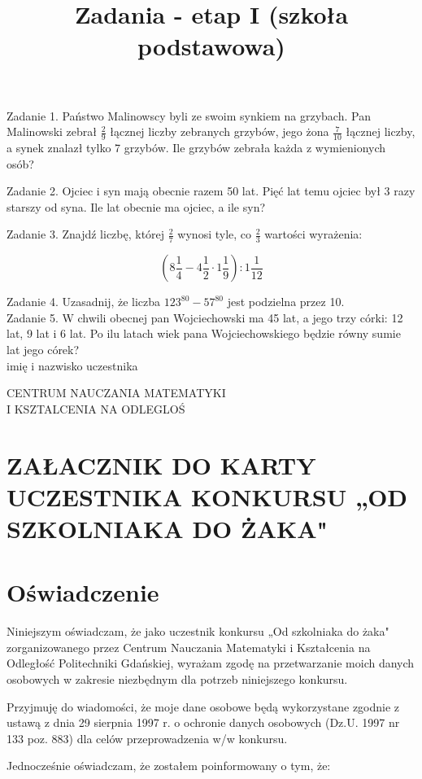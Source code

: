 \documentclass[10pt]{article}
\title{Zadania - etap I (szkoła podstawowa) }
\author{}
\date{}
\begin{document}
\maketitle
Zadanie 1. Państwo Malinowscy byli ze swoim synkiem na grzybach. Pan Malinowski zebrał \(\frac{2}{9}\) łącznej liczby zebranych grzybów, jego żona \(\frac{7}{10}\) łącznej liczby, a synek znalazł tylko 7 grzybów. Ile grzybów zebrała każda z wymienionych osób?

Zadanie 2. Ojciec i syn mają obecnie razem 50 lat. Pięć lat temu ojciec był 3 razy starszy od syna. Ile lat obecnie ma ojciec, a ile syn?

Zadanie 3. Znajdź liczbę, której \(\frac{2}{7}\) wynosi tyle, co \(\frac{2}{3}\) wartości wyrażenia:

\[
\left(8 \frac{1}{4}-4 \frac{1}{2} \cdot 1 \frac{1}{9}\right): 1 \frac{1}{12}
\]

Zadanie 4. Uzasadnij, że liczba \(123^{80}-57^{80}\) jest podzielna przez 10.\\
Zadanie 5. W chwili obecnej pan Wojciechowski ma 45 lat, a jego trzy córki: 12 lat, 9 lat i 6 lat. Po ilu latach wiek pana Wojciechowskiego będzie równy sumie lat jego córek?\\
imię i nazwisko uczestnika

CENTRUM NAUCZANIA MATEMATYKI\\
I KSZTALCENIA NA ODLEGLOŚ\\
\(\qquad\)

\section*{ZAŁACZNIK DO KARTY UCZESTNIKA KONKURSU „OD SZKOLNIAKA DO ŻAKA"}
\section*{Oświadczenie}
Niniejszym oświadczam, że jako uczestnik konkursu „Od szkolniaka do żaka" zorganizowanego przez Centrum Nauczania Matematyki i Kształcenia na Odległość Politechniki Gdańskiej, wyrażam zgodę na przetwarzanie moich danych osobowych w zakresie niezbędnym dla potrzeb niniejszego konkursu.

Przyjmuję do wiadomości, że moje dane osobowe będą wykorzystane zgodnie z ustawą z dnia 29 sierpnia 1997 r. o ochronie danych osobowych (Dz.U. 1997 nr 133 poz. 883) dla celów przeprowadzenia w/w konkursu.

Jednocześnie oświadczam, że zostałem poinformowany o tym, że:
\end{document}
